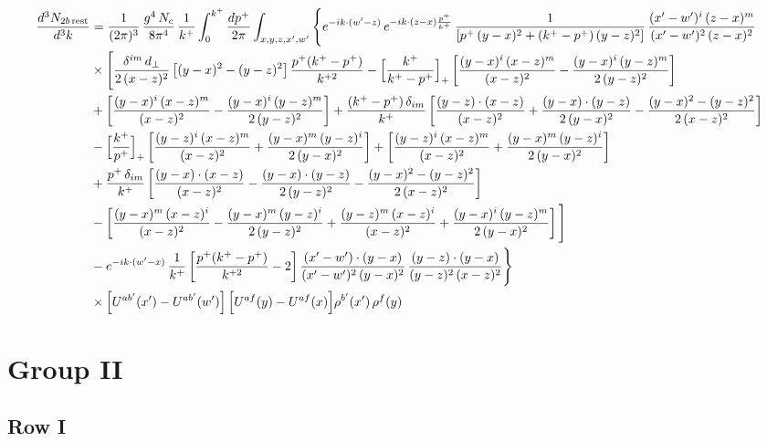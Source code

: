 \documentclass[9pt]{article}
\numberwithin{equation}{section}
\begin{document}
\begin{align}
\frac{d^{3}N_{2b\,\rm rest}}{d^{3}k} & =\frac{1}{(2\pi)^{3}}\,\frac{g^{4}\,N_{c}}{8\pi^{4}}\,\frac{1}{k^{+}}\int_{0}^{k^{+}}\frac{dp^{+}}{2\pi}\int_{x,y,z,x',w'}\Bigg\{e^{-ik\cdot(w'-z)}\,e^{-ik\cdot(z-x)\frac{p^{+}}{k^{+}}}\,\frac{1}{\left[p^{+}\,(y-x)^{2}+(k^{+}-p^{+})\,(y-z)^{2}\right]}\,\frac{(x'-w')^{i}\,(z-x)^{m}}{(x'-w')^{2}\,(z-x)^{2}}\notag\\
&\times\Bigg[\frac{\delta^{im}\,d_{\perp}}{2\,(x-z)^{2}}\left[(y-x)^{2}-(y-z)^{2}\right]\frac{p^{+}(k^{+}-p^{+})}{k^{+2}}
-\Big[\frac{k^{+}}{k^{+}-p^{+}}\Big]_{+}\left[\frac{(y-x)^{i}\,(x-z)^{m}}{(x-z)^{2}}-\frac{(y-x)^{i}\,(y-z)^{m}}{2\,(y-z)^{2}}\right]\notag\\
&+\left[\frac{(y-x)^{i}\,(x-z)^{m}}{(x-z)^{2}}-\frac{(y-x)^{i}\,(y-z)^{m}}{2\,(y-z)^{2}}\right]
+\frac{(k^{+}-p^{+})\,\delta_{im}}{k^{+}}\left[\frac{(y-z)\cdot(x-z)}{(x-z)^{2}}+\frac{(y-x)\cdot(y-z)}{2\,(y-x)^{2}}-\frac{(y-x)^{2}-(y-z)^{2}}{2\,(x-z)^{2}}\right]\notag\\
&-\Big[\frac{k^{+}}{p^{+}}\Big]_{+}\left[\frac{(y-z)^{i}\,(x-z)^{m}}{(x-z)^{2}}+\frac{(y-x)^{m}\,(y-z)^{i}}{2\,(y-x)^{2}}\right]+\left[\frac{(y-z)^{i}\,(x-z)^{m}}{(x-z)^{2}}+\frac{(y-x)^{m}\,(y-z)^{i}}{2\,(y-x)^{2}}\right]\notag\\
&+\frac{p^{+}\,\delta_{im}}{k^{+}}\left[\frac{(y-x)\cdot(x-z)}{(x-z)^{2}}-\frac{(y-x)\cdot(y-z)}{2\,(y-z)^{2}}-\frac{(y-x)^{2}-(y-z)^{2}}{2\,(x-z)^{2}}\right]\notag\\
&-\left[\frac{(y-x)^{m}\,(x-z)^{i}}{(x-z)^{2}}-\frac{(y-x)^{m}\,(y-z)^{i}}{2\,(y-z)^{2}}+\frac{(y-z)^{m}\,(x-z)^{i}}{(x-z)^{2}}+\frac{(y-x)^{i}\,(y-z)^{m}}{2\,(y-x)^{2}}\right]\Bigg]\notag\\
&-e^{-ik\cdot(w'-x)}\,\frac{1}{k^{+}}\left[\frac{p^{+}(k^{+}-p^{+})}{k^{+2}}-2\right]\frac{(x'-w')\cdot(y-x)}{(x'-w')^{2}\,(y-x)^{2}}\,\frac{(y-z)\cdot(y-x)}{(y-z)^{2}\,(x-z)^{2}}\Bigg\}\notag\\
&\times\Big[U^{ab'}(x')-U^{ab'}(w')\Big]\,\Big[U^{af}(y)-U^{af}(x)\Big]\rho^{b'}(x')\,\rho^{f}(y)
\end{align}
\section{Group II}
\subsection{Row I}
\end{document}
